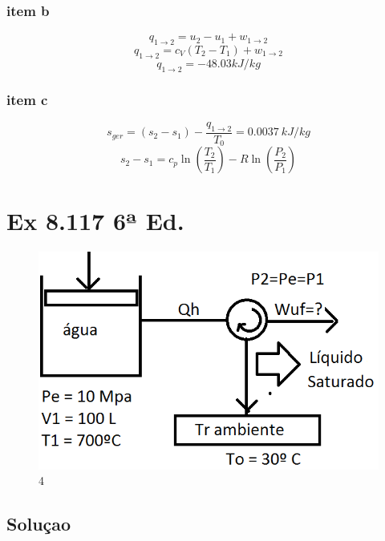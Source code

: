 \documentclass[a4paper, 12pt]{article}
\begin{document}
\subsubsection*{item b}
\[q _{1 \rightarrow 2}= u_{2}-u_{1}+w _{1 \rightarrow 2}\]
\[q _{1 \rightarrow 2}=c_{V}(T_{2}-T_{1})+w _{1 \rightarrow 2}\]
\[q _{1 \rightarrow 2}=-48.03 kJ/kg\]
\subsubsection*{item c}
\[s_{ger}=(s_{2}-s_{1})-\frac{q _{1 \rightarrow 2}}{T_{0}}=0.0037\ kJ/kg\]
\[s_{2}-s_{1}=c_{p}\ln(\frac{T_{2}}{T_{1}})-R\ln(\frac{P_{2}}{P_{1}})\]
\newpage
\section{ Ex 8.117  6ª Ed.}

\begin{figure}[h]
\begin{center}
\includegraphics[scale=0.68]{./fig/4.png}
\caption{\label{fig:4}4} 
\end{center}
\end{figure}




\subsection*{Soluçao}
\end{document}
